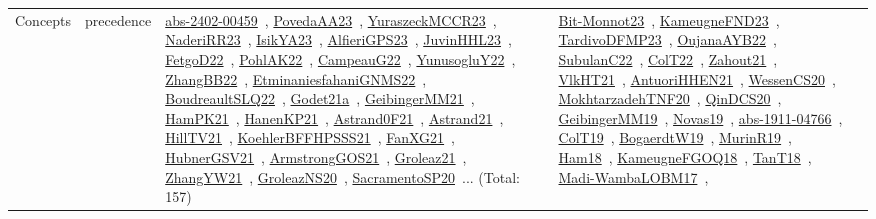 {\begin{longtable}{lp{3cm}>{\raggedright\arraybackslash}p{6cm}>{\raggedright\arraybackslash}p{6cm}>{\raggedright\arraybackslash}p{8cm}}
Concepts & precedence & \href{works/abs-2402-00459.pdf}{abs-2402-00459}~\cite{abs-2402-00459}, \href{works/PovedaAA23.pdf}{PovedaAA23}~\cite{PovedaAA23}, \href{works/YuraszeckMCCR23.pdf}{YuraszeckMCCR23}~\cite{YuraszeckMCCR23}, \href{works/NaderiRR23.pdf}{NaderiRR23}~\cite{NaderiRR23}, \href{works/IsikYA23.pdf}{IsikYA23}~\cite{IsikYA23}, \href{works/AlfieriGPS23.pdf}{AlfieriGPS23}~\cite{AlfieriGPS23}, \href{works/JuvinHHL23.pdf}{JuvinHHL23}~\cite{JuvinHHL23}, \href{works/FetgoD22.pdf}{FetgoD22}~\cite{FetgoD22}, \href{works/PohlAK22.pdf}{PohlAK22}~\cite{PohlAK22}, \href{works/CampeauG22.pdf}{CampeauG22}~\cite{CampeauG22}, \href{works/YunusogluY22.pdf}{YunusogluY22}~\cite{YunusogluY22}, \href{works/ZhangBB22.pdf}{ZhangBB22}~\cite{ZhangBB22}, \href{works/EtminaniesfahaniGNMS22.pdf}{EtminaniesfahaniGNMS22}~\cite{EtminaniesfahaniGNMS22}, \href{works/BoudreaultSLQ22.pdf}{BoudreaultSLQ22}~\cite{BoudreaultSLQ22}, \href{works/Godet21a.pdf}{Godet21a}~\cite{Godet21a}, \href{works/GeibingerMM21.pdf}{GeibingerMM21}~\cite{GeibingerMM21}, \href{works/HamPK21.pdf}{HamPK21}~\cite{HamPK21}, \href{works/HanenKP21.pdf}{HanenKP21}~\cite{HanenKP21}, \href{works/Astrand0F21.pdf}{Astrand0F21}~\cite{Astrand0F21}, \href{works/Astrand21.pdf}{Astrand21}~\cite{Astrand21}, \href{works/HillTV21.pdf}{HillTV21}~\cite{HillTV21}, \href{works/KoehlerBFFHPSSS21.pdf}{KoehlerBFFHPSSS21}~\cite{KoehlerBFFHPSSS21}, \href{works/FanXG21.pdf}{FanXG21}~\cite{FanXG21}, \href{works/HubnerGSV21.pdf}{HubnerGSV21}~\cite{HubnerGSV21}, \href{works/ArmstrongGOS21.pdf}{ArmstrongGOS21}~\cite{ArmstrongGOS21}, \href{works/Groleaz21.pdf}{Groleaz21}~\cite{Groleaz21}, \href{works/ZhangYW21.pdf}{ZhangYW21}~\cite{ZhangYW21}, \href{works/GroleazNS20.pdf}{GroleazNS20}~\cite{GroleazNS20}, \href{works/SacramentoSP20.pdf}{SacramentoSP20}~\cite{SacramentoSP20}... (Total: 157) & \href{works/Bit-Monnot23.pdf}{Bit-Monnot23}~\cite{Bit-Monnot23}, \href{works/KameugneFND23.pdf}{KameugneFND23}~\cite{KameugneFND23}, \href{works/TardivoDFMP23.pdf}{TardivoDFMP23}~\cite{TardivoDFMP23}, \href{works/OujanaAYB22.pdf}{OujanaAYB22}~\cite{OujanaAYB22}, \href{works/SubulanC22.pdf}{SubulanC22}~\cite{SubulanC22}, \href{works/ColT22.pdf}{ColT22}~\cite{ColT22}, \href{works/Zahout21.pdf}{Zahout21}~\cite{Zahout21}, \href{works/VlkHT21.pdf}{VlkHT21}~\cite{VlkHT21}, \href{works/AntuoriHHEN21.pdf}{AntuoriHHEN21}~\cite{AntuoriHHEN21}, \href{works/WessenCS20.pdf}{WessenCS20}~\cite{WessenCS20}, \href{works/MokhtarzadehTNF20.pdf}{MokhtarzadehTNF20}~\cite{MokhtarzadehTNF20}, \href{works/QinDCS20.pdf}{QinDCS20}~\cite{QinDCS20}, \href{works/GeibingerMM19.pdf}{GeibingerMM19}~\cite{GeibingerMM19}, \href{works/Novas19.pdf}{Novas19}~\cite{Novas19}, \href{works/abs-1911-04766.pdf}{abs-1911-04766}~\cite{abs-1911-04766}, \href{works/ColT19.pdf}{ColT19}~\cite{ColT19}, \href{works/BogaerdtW19.pdf}{BogaerdtW19}~\cite{BogaerdtW19}, \href{works/MurinR19.pdf}{MurinR19}~\cite{MurinR19}, \href{works/Ham18.pdf}{Ham18}~\cite{Ham18}, \href{works/KameugneFGOQ18.pdf}{KameugneFGOQ18}~\cite{KameugneFGOQ18}, \href{works/TanT18.pdf}{TanT18}~\cite{TanT18}, \href{works/Madi-WambaLOBM17.pdf}{Madi-WambaLOBM17}~\cite{Madi-WambaLOBM17}, 
\end{longtable}}
